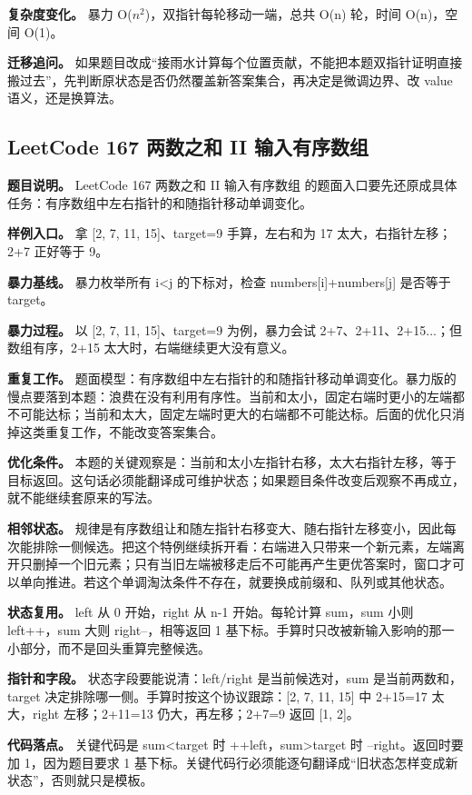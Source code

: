 \textbf{复杂度变化。} 暴力 O(\ensuremath{n^{2}})，双指针每轮移动一端，总共 O(n) 轮，时间 O(n)，空间 O(1)。

\textbf{迁移追问。} 如果题目改成“接雨水计算每个位置贡献，不能把本题双指针证明直接搬过去”，先判断原状态是否仍然覆盖新答案集合，再决定是微调边界、改 value 语义，还是换算法。

\subsection{LeetCode 167 两数之和 II 输入有序数组}

\textbf{题目说明。} LeetCode 167 两数之和 II 输入有序数组 的题面入口要先还原成具体任务：有序数组中左右指针的和随指针移动单调变化。

\textbf{样例入口。} 拿 [2, 7, 11, 15]、target=9 手算，左右和为 17 太大，右指针左移；2+7 正好等于 9。

\textbf{暴力基线。} 暴力枚举所有 i<j 的下标对，检查 numbers[i]+numbers[j] 是否等于 target。

\textbf{暴力过程。} 以 [2, 7, 11, 15]、target=9 为例，暴力会试 2+7、2+11、2+15...；但数组有序，2+15 太大时，右端继续更大没有意义。

\textbf{重复工作。} 题面模型：有序数组中左右指针的和随指针移动单调变化。暴力版的慢点要落到本题：浪费在没有利用有序性。当前和太小，固定右端时更小的左端都不可能达标；当前和太大，固定左端时更大的右端都不可能达标。后面的优化只消掉这类重复工作，不能改变答案集合。

\textbf{优化条件。} 本题的关键观察是：当前和太小左指针右移，太大右指针左移，等于目标返回。这句话必须能翻译成可维护状态；如果题目条件改变后观察不再成立，就不能继续套原来的写法。

\textbf{相邻状态。} 规律是有序数组让和随左指针右移变大、随右指针左移变小，因此每次能排除一侧候选。把这个特例继续拆开看：右端进入只带来一个新元素，左端离开只删掉一个旧元素；只有当旧左端被移走后不可能再产生更优答案时，窗口才可以单向推进。若这个单调淘汰条件不存在，就要换成前缀和、队列或其他状态。

\textbf{状态复用。} left 从 0 开始，right 从 n-1 开始。每轮计算 sum，sum 小则 left++，sum 大则 right--，相等返回 1 基下标。手算时只改被新输入影响的那一小部分，而不是回头重算完整候选。

\textbf{指针和字段。} 状态字段要能说清：left/right 是当前候选对，sum 是当前两数和，target 决定排除哪一侧。手算时按这个协议跟踪：[2, 7, 11, 15] 中 2+15=17 太大，right 左移；2+11=13 仍大，再左移；2+7=9 返回 [1, 2]。

\textbf{代码落点。} 关键代码是 sum<target 时 ++left，sum>target 时 --right。返回时要加 1，因为题目要求 1 基下标。关键代码行必须能逐句翻译成“旧状态怎样变成新状态”，否则就只是模板。

